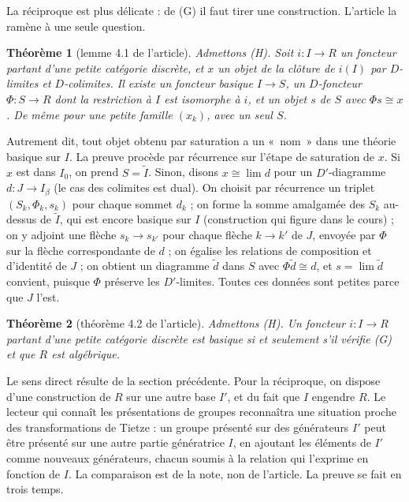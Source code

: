 \documentclass[11pt,a4paper]{amsart}
\theoremstyle{definition}
\theoremstyle{plain}
\newtheorem{theoreme}{Théorème}
\theoremstyle{remark}
\newcommand{\It}{\widetilde I}
\begin{document}
La réciproque est plus délicate : de (G) il faut tirer une construction. L'article la ramène à une seule question.

\begin{theoreme}[lemme 4.1 de l'article]
Admettons (H). Soit $i\colon I\to R$ un foncteur partant d'une petite catégorie discrète, et $x$ un objet de la clôture de $i(I)$ par $D$-limites et $D$-colimites. Il existe un foncteur basique $I\to S$, un $D$-foncteur $\Phi\colon S\to R$ dont la restriction à $I$ est isomorphe à $i$, et un objet $s$ de $S$ avec $\Phi s\cong x$. De même pour une petite famille $(x_k)$, avec un seul $S$.
\end{theoreme}

Autrement dit, tout objet obtenu par saturation a un «~nom~» dans une théorie basique sur $I$. La preuve procède par récurrence sur l'étape de saturation de $x$. Si $x$ est dans $I_0$, on prend $S=\It$. Sinon, disons $x\cong\lim d$ pour un $D'$-diagramme $d\colon J\to I_\beta$ (le cas des colimites est dual). On choisit par récurrence un triplet $(S_k,\Phi_k,s_k)$ pour chaque sommet $d_k$ ; on forme la somme amalgamée des $S_k$ au-dessus de $\It$, qui est encore basique sur $I$ (construction qui figure dans le cours) ; on y adjoint une flèche $s_k\to s_{k'}$ pour chaque flèche $k\to k'$ de $J$, envoyée par $\Phi$ sur la flèche correspondante de $d$ ; on égalise les relations de composition et d'identité de $J$ ; on obtient un diagramme $\tilde d$ dans $S$ avec $\Phi\tilde d\cong d$, et $s=\lim\tilde d$ convient, puisque $\Phi$ préserve les $D'$-limites. Toutes ces données sont petites parce que $J$ l'est.

\begin{theoreme}[théorème 4.2 de l'article]
Admettons (H). Un foncteur $i\colon I\to R$ partant d'une petite catégorie discrète est basique si et seulement s'il vérifie (G) et que $R$ est algébrique.
\end{theoreme}

Le sens direct résulte de la section précédente. Pour la réciproque, on dispose d'une construction de $R$ sur une autre base $I'$, et du fait que $I$ engendre $R$. Le lecteur qui connaît les présentations de groupes reconnaîtra une situation proche des transformations de Tietze : un groupe présenté sur des générateurs $I'$ peut être présenté sur une autre partie génératrice $I$, en ajoutant les éléments de $I'$ comme nouveaux générateurs, chacun soumis à la relation qui l'exprime en fonction de $I$. La comparaison est de la note, non de l'article. La preuve se fait en trois temps.
\end{document}
